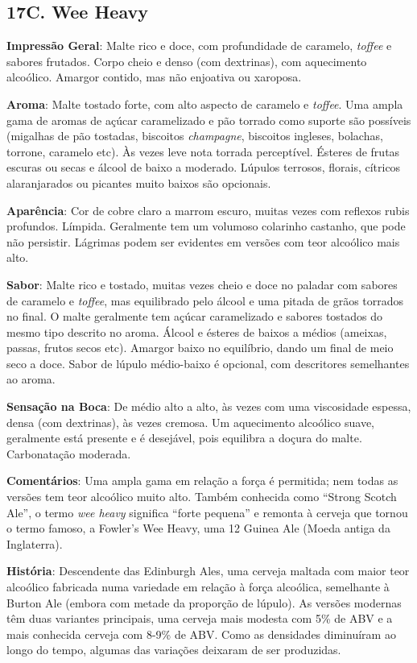 \subsection*{17C. Wee Heavy}
\textbf{Impressão Geral}: Malte rico e doce, com profundidade de caramelo, \textit{toffee} e sabores frutados. Corpo cheio e denso (com dextrinas), com aquecimento alcoólico. Amargor contido, mas não enjoativa ou xaroposa.

\textbf{Aroma}: Malte tostado forte, com alto aspecto de caramelo e \textit{toffee}. Uma ampla gama de aromas de açúcar caramelizado e pão torrado como suporte são possíveis (migalhas de pão tostadas, biscoitos \textit{champagne}, biscoitos ingleses, bolachas, torrone, caramelo etc). Às vezes leve nota torrada perceptível. Ésteres de frutas escuras ou secas e álcool de baixo a moderado. Lúpulos terrosos, florais, cítricos alaranjarados ou picantes muito baixos são opcionais.

\textbf{Aparência}: Cor de cobre claro a marrom escuro, muitas vezes com reflexos rubis profundos. Límpida. Geralmente tem um volumoso colarinho castanho, que pode não persistir. Lágrimas podem ser evidentes em versões com teor alcoólico mais alto.

\textbf{Sabor}: Malte rico e tostado, muitas vezes cheio e doce no paladar com sabores de caramelo e \textit{toffee}, mas equilibrado pelo álcool e uma pitada de grãos torrados no final. O malte geralmente tem açúcar caramelizado e sabores tostados do mesmo tipo descrito no aroma. Álcool e ésteres de baixos a médios (ameixas, passas, frutos secos etc). Amargor baixo no equilíbrio, dando um final de meio seco a doce. Sabor de lúpulo médio-baixo é opcional, com descritores semelhantes ao aroma.

\textbf{Sensação na Boca}: De médio alto a alto, às vezes com uma viscosidade espessa, densa (com dextrinas), às vezes cremosa. Um aquecimento alcoólico suave, geralmente está presente e é desejável, pois equilibra a doçura do malte. Carbonatação moderada.

\textbf{Comentários}: Uma ampla gama em relação a força é permitida; nem todas as versões tem teor alcoólico muito alto. Também conhecida como “Strong Scotch Ale”, o termo \textit{wee heavy} significa “forte pequena” e remonta à cerveja que tornou o termo famoso, a Fowler’s Wee Heavy, uma 12 Guinea Ale (Moeda antiga da Inglaterra).

\textbf{História}: Descendente das Edinburgh Ales, uma cerveja maltada com maior teor alcoólico fabricada numa variedade em relação à força alcoólica, semelhante à Burton Ale (embora com metade da proporção de lúpulo). As versões modernas têm duas variantes principais, uma cerveja mais modesta com 5\% de ABV e a mais conhecida cerveja com 8-9\% de ABV. Como as densidades diminuíram ao longo do tempo, algumas das variações deixaram de ser produzidas.


